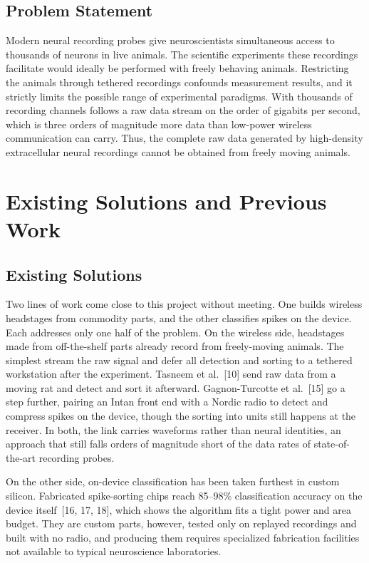 \documentclass[11pt]{article}
\begin{document}
\subsection{Problem Statement}
Modern neural recording probes give neuroscientists simultaneous access to thousands of neurons in live animals.
The scientific experiments these recordings facilitate would ideally be performed with freely behaving animals. 
Restricting the animals through tethered recordings confounds measurement results, and it strictly limits the possible 
range of experimental paradigms. With thousands of recording channels follows a raw data stream on the order of gigabits
per second, which is three orders of magnitude more data than low-power wireless communication can carry. Thus,
the complete raw data generated by high-density extracellular neural recordings cannot be obtained from freely moving animals.


\section{Existing Solutions and Previous Work}

\subsection{Existing Solutions}
Two lines of work come close to this project without meeting. One builds wireless
headstages from commodity parts, and the other classifies spikes on the device. Each
addresses only one half of the problem. On the wireless side, headstages made from off-the-shelf parts
already record from freely-moving animals. The simplest stream the raw signal and defer
all detection and sorting to a tethered workstation after the experiment. Tasneem et
al.~[10] send raw data from a moving rat and detect and sort it afterward.
Gagnon-Turcotte et al.~[15] go a step further, pairing an Intan front end with a
Nordic radio to detect and compress spikes on the device, though the sorting into units
still happens at the receiver. In both, the link carries waveforms rather than neural
identities, an approach that still falls orders of magnitude short of the data rates of
state-of-the-art recording probes.

On the other side, on-device classification has been taken furthest in custom silicon.
Fabricated spike-sorting chips reach 85--98\% classification accuracy on the device
itself~[16, 17, 18], which shows the algorithm fits a tight power and area budget. They
are custom parts, however, tested only on replayed recordings and built with no radio,
and producing them requires specialized fabrication facilities not available to typical
neuroscience laboratories.
\end{document}

